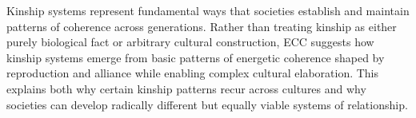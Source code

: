 Kinship systems represent fundamental ways that societies establish and maintain patterns of coherence across generations. Rather than treating kinship as either purely biological fact or arbitrary cultural construction, ECC suggests how kinship systems emerge from basic patterns of energetic coherence shaped by reproduction and alliance while enabling complex cultural elaboration. This explains both why certain kinship patterns recur across cultures and why societies can develop radically different but equally viable systems of relationship.









